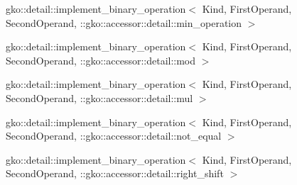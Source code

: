 \begin{DoxyCompactList}
\begin{DoxyCompactList}
\end{DoxyCompactList}
\item gko\+:\+:detail\+:\+:implement\+\_\+binary\+\_\+operation$<$ Kind, First\+Operand, Second\+Operand, \+:\+:gko\+:\+:accessor\+:\+:detail\+:\+:min\+\_\+operation $>$\begin{DoxyCompactList}
\item {}
\end{DoxyCompactList}
\item gko\+:\+:detail\+:\+:implement\+\_\+binary\+\_\+operation$<$ Kind, First\+Operand, Second\+Operand, \+:\+:gko\+:\+:accessor\+:\+:detail\+:\+:mod $>$\begin{DoxyCompactList}
\item {}
\end{DoxyCompactList}
\item gko\+:\+:detail\+:\+:implement\+\_\+binary\+\_\+operation$<$ Kind, First\+Operand, Second\+Operand, \+:\+:gko\+:\+:accessor\+:\+:detail\+:\+:mul $>$\begin{DoxyCompactList}
\item {}
\end{DoxyCompactList}
\item gko\+:\+:detail\+:\+:implement\+\_\+binary\+\_\+operation$<$ Kind, First\+Operand, Second\+Operand, \+:\+:gko\+:\+:accessor\+:\+:detail\+:\+:not\+\_\+equal $>$\begin{DoxyCompactList}
\item {}
\end{DoxyCompactList}
\item gko\+:\+:detail\+:\+:implement\+\_\+binary\+\_\+operation$<$ Kind, First\+Operand, Second\+Operand, \+:\+:gko\+:\+:accessor\+:\+:detail\+:\+:right\+\_\+shift $>$\begin{DoxyCompactList}
\item {}

\end{DoxyCompactList}
\end{DoxyCompactList}
